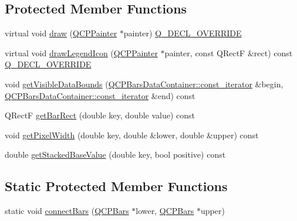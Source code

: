 \subsection*{Protected Member Functions}
\begin{DoxyCompactItemize}
\item 
virtual void \hyperlink{class_q_c_p_bars_aa267c20650d55084c3f47cb2f8fac9dc}{draw} (\hyperlink{class_q_c_p_painter}{Q\+C\+P\+Painter} $\ast$painter) \hyperlink{qcustomplot_8h_a42cc5eaeb25b85f8b52d2a4b94c56f55}{Q\+\_\+\+D\+E\+C\+L\+\_\+\+O\+V\+E\+R\+R\+I\+DE}
\item 
virtual void \hyperlink{class_q_c_p_bars_aee7c3e1763fd6b504c45baa8775be7b7}{draw\+Legend\+Icon} (\hyperlink{class_q_c_p_painter}{Q\+C\+P\+Painter} $\ast$painter, const Q\+RectF \&rect) const \hyperlink{qcustomplot_8h_a42cc5eaeb25b85f8b52d2a4b94c56f55}{Q\+\_\+\+D\+E\+C\+L\+\_\+\+O\+V\+E\+R\+R\+I\+DE}
\item 
void \hyperlink{class_q_c_p_bars_ac8b6b514a665a7bff4fb080413ba996a}{get\+Visible\+Data\+Bounds} (\hyperlink{class_q_c_p_data_container_ae40a91f5cb0bcac61d727427449b7d15}{Q\+C\+P\+Bars\+Data\+Container\+::const\+\_\+iterator} \&begin, \hyperlink{class_q_c_p_data_container_ae40a91f5cb0bcac61d727427449b7d15}{Q\+C\+P\+Bars\+Data\+Container\+::const\+\_\+iterator} \&end) const
\item 
Q\+RectF \hyperlink{class_q_c_p_bars_a01b87e38e5d5089d214646d2af7896ea}{get\+Bar\+Rect} (double key, double value) const
\item 
void \hyperlink{class_q_c_p_bars_ad87586cc5e9806740bc0e867667da409}{get\+Pixel\+Width} (double key, double \&lower, double \&upper) const
\item 
double \hyperlink{class_q_c_p_bars_a0ffd6e043876e13e89eaa54e9f8a04b9}{get\+Stacked\+Base\+Value} (double key, bool positive) const
\end{DoxyCompactItemize}
\subsection*{Static Protected Member Functions}
\begin{DoxyCompactItemize}
\item 
static void \hyperlink{class_q_c_p_bars_a6ea37802cd22f97235cab614b14b9f19}{connect\+Bars} (\hyperlink{class_q_c_p_bars}{Q\+C\+P\+Bars} $\ast$lower, \hyperlink{class_q_c_p_bars}{Q\+C\+P\+Bars} $\ast$upper)
\end{DoxyCompactItemize}
